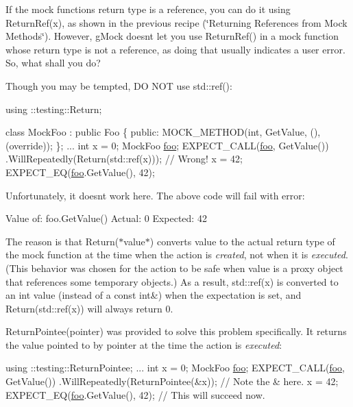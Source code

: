 If the mock function\textquotesingle{}s return type is a reference, you can do it using {\ttfamily Return\+Ref(x)}, as shown in the previous recipe (\char`\"{}\+Returning References from Mock
\+Methods\char`\"{}). However, g\+Mock doesn\textquotesingle{}t let you use {\ttfamily Return\+Ref()} in a mock function whose return type is not a reference, as doing that usually indicates a user error. So, what shall you do?

Though you may be tempted, DO N\+OT use {\ttfamily std\+::ref()}\+:


\begin{DoxyCode}
using ::testing::Return;

\textcolor{keyword}{class }MockFoo : \textcolor{keyword}{public} Foo \{
 \textcolor{keyword}{public}:
  MOCK\_METHOD(\textcolor{keywordtype}{int}, GetValue, (), (\textcolor{keyword}{override}));
\};
...
  \textcolor{keywordtype}{int} x = 0;
  MockFoo \mbox{\hyperlink{namespacefoo}{foo}};
  EXPECT\_CALL(\mbox{\hyperlink{namespacefoo}{foo}}, GetValue())
      .WillRepeatedly(Return(std::ref(x)));  \textcolor{comment}{// Wrong!}
  x = 42;
  EXPECT\_EQ(\mbox{\hyperlink{namespacefoo}{foo}}.GetValue(), 42);
\end{DoxyCode}


Unfortunately, it doesn\textquotesingle{}t work here. The above code will fail with error\+:


\begin{DoxyCode}
Value of: foo.GetValue()
  Actual: 0
Expected: 42
\end{DoxyCode}


The reason is that {\ttfamily Return($\ast$value$\ast$)} converts {\ttfamily value} to the actual return type of the mock function at the time when the action is {\itshape created}, not when it is {\itshape executed}. (This behavior was chosen for the action to be safe when {\ttfamily value} is a proxy object that references some temporary objects.) As a result, {\ttfamily std\+::ref(x)} is converted to an {\ttfamily int} value (instead of a {\ttfamily const int\&}) when the expectation is set, and {\ttfamily Return(std\+::ref(x))} will always return 0.

{\ttfamily Return\+Pointee(pointer)} was provided to solve this problem specifically. It returns the value pointed to by {\ttfamily pointer} at the time the action is {\itshape executed}\+:


\begin{DoxyCode}
using ::testing::ReturnPointee;
...
  \textcolor{keywordtype}{int} x = 0;
  MockFoo \mbox{\hyperlink{namespacefoo}{foo}};
  EXPECT\_CALL(\mbox{\hyperlink{namespacefoo}{foo}}, GetValue())
      .WillRepeatedly(ReturnPointee(&x));  \textcolor{comment}{// Note the & here.}
  x = 42;
  EXPECT\_EQ(\mbox{\hyperlink{namespacefoo}{foo}}.GetValue(), 42);  \textcolor{comment}{// This will succeed now.}
\end{DoxyCode}


